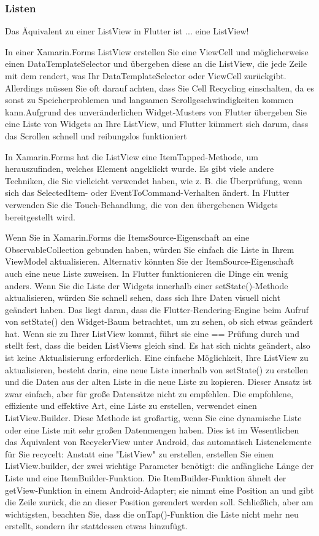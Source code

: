 \subsubsection{Listen}

Das Äquivalent zu einer ListView in Flutter ist ... eine ListView!

In einer Xamarin.Forms ListView erstellen Sie eine ViewCell und möglicherweise einen DataTemplateSelector und übergeben diese an die ListView, die jede Zeile mit dem rendert, was Ihr DataTemplateSelector oder ViewCell zurückgibt. Allerdings müssen Sie oft darauf achten, dass Sie Cell Recycling einschalten, da es sonst zu Speicherproblemen und langsamen Scrollgeschwindigkeiten kommen kann.Aufgrund des unveränderlichen Widget-Musters von Flutter übergeben Sie eine Liste von Widgets an Ihre ListView, und Flutter kümmert sich darum, dass das Scrollen schnell und reibungslos funktioniert

In Xamarin.Forms hat die ListView eine ItemTapped-Methode, um herauszufinden, welches Element angeklickt wurde. Es gibt viele andere Techniken, die Sie vielleicht verwendet haben, wie z. B. die Überprüfung, wenn sich das SelectedItem- oder EventToCommand-Verhalten ändert. In Flutter verwenden Sie die Touch-Behandlung, die von den übergebenen Widgets bereitgestellt wird.

Wenn Sie in Xamarin.Forms die ItemsSource-Eigenschaft an eine ObservableCollection gebunden haben, würden Sie einfach die Liste in Ihrem ViewModel aktualisieren. Alternativ könnten Sie der ItemSource-Eigenschaft auch eine neue Liste zuweisen. In Flutter funktionieren die Dinge ein wenig anders. Wenn Sie die Liste der Widgets innerhalb einer setState()-Methode aktualisieren, würden Sie schnell sehen, dass sich Ihre Daten visuell nicht geändert haben. Das liegt daran, dass die Flutter-Rendering-Engine beim Aufruf von setState() den Widget-Baum betrachtet, um zu sehen, ob sich etwas geändert hat. Wenn sie zu Ihrer ListView kommt, führt sie eine == Prüfung durch und stellt fest, dass die beiden ListViews gleich sind. Es hat sich nichts geändert, also ist keine Aktualisierung erforderlich. Eine einfache Möglichkeit, Ihre ListView zu aktualisieren, besteht darin, eine neue Liste innerhalb von setState() zu erstellen und die Daten aus der alten Liste in die neue Liste zu kopieren. Dieser Ansatz ist zwar einfach, aber für große Datensätze nicht zu empfehlen. Die empfohlene, effiziente und effektive Art, eine Liste zu erstellen, verwendet einen ListView.Builder. Diese Methode ist großartig, wenn Sie eine dynamische Liste oder eine Liste mit sehr großen Datenmengen haben. Dies ist im Wesentlichen das Äquivalent von RecyclerView unter Android, das automatisch Listenelemente für Sie recycelt:
Anstatt eine "ListView" zu erstellen, erstellen Sie einen ListView.builder, der zwei wichtige Parameter benötigt: die anfängliche Länge der Liste und eine ItemBuilder-Funktion. Die ItemBuilder-Funktion ähnelt der getView-Funktion in einem Android-Adapter; sie nimmt eine Position an und gibt die Zeile zurück, die an dieser Position gerendert werden soll. Schließlich, aber am wichtigsten, beachten Sie, dass die onTap()-Funktion die Liste nicht mehr neu erstellt, sondern ihr stattdessen etwas hinzufügt.



